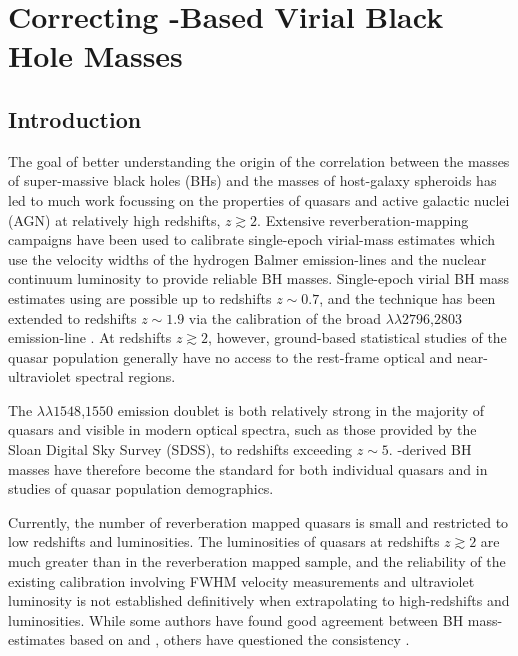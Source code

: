 
\chapter{Correcting -Based Virial Black Hole Masses}
\label{ch:bhmass}

\section{Introduction}
\label{sec:ch3-intro}

The goal of better understanding the origin of the correlation between the masses of super-massive black holes (BHs) and the masses of host-galaxy spheroids has led to much work focussing on the properties of quasars and active galactic nuclei (AGN) at relatively high redshifts, $z\gtrsim 2$. 
Extensive reverberation-mapping campaigns have been used to calibrate single-epoch virial-mass estimates which use the velocity widths of the hydrogen Balmer emission-lines and the nuclear continuum luminosity to provide reliable BH masses.  
Single-epoch virial BH mass estimates using \hb are possible up to redshifts $z\sim0.7$, and the technique has been extended to redshifts $z\sim1.9$ via the calibration of the broad $\lambda\lambda$$2796$,$2803$ emission-line \citep{mclure02,onken08,wang09,rafiee11}. 
At redshifts $z\gtrsim2$, however, ground-based statistical studies of the quasar population generally have no access to the rest-frame optical and near-ultraviolet spectral regions.

The $\lambda\lambda$$1548$,$1550$ emission doublet is both relatively strong in the majority of quasars and visible in modern optical spectra, such as those provided by the Sloan Digital Sky Survey (SDSS), to redshifts exceeding $z\sim5$. 
-derived BH masses have therefore become the standard \citep[e.g.][]{vestergaard06,park13} for both individual quasars and in studies of quasar population demographics.

Currently, the number of reverberation mapped quasars is small \citep[$\sim50$ quasars;][]{park13} and restricted to low redshifts and luminosities. 
The luminosities of quasars at redshifts $z\gtrsim 2$ are much greater than in the reverberation mapped sample, and the reliability of the existing calibration involving  FWHM velocity measurements and ultraviolet luminosity is not established definitively when extrapolating to high-redshifts and luminosities. 
While some authors have found good agreement between BH mass-estimates based on  and \hb \citep[e.g.][]{vestergaard06, assef11, tilton13}, others have questioned the consistency \citep[e.g.][]{baskin05,trakhtenbrot12,shen12}.

